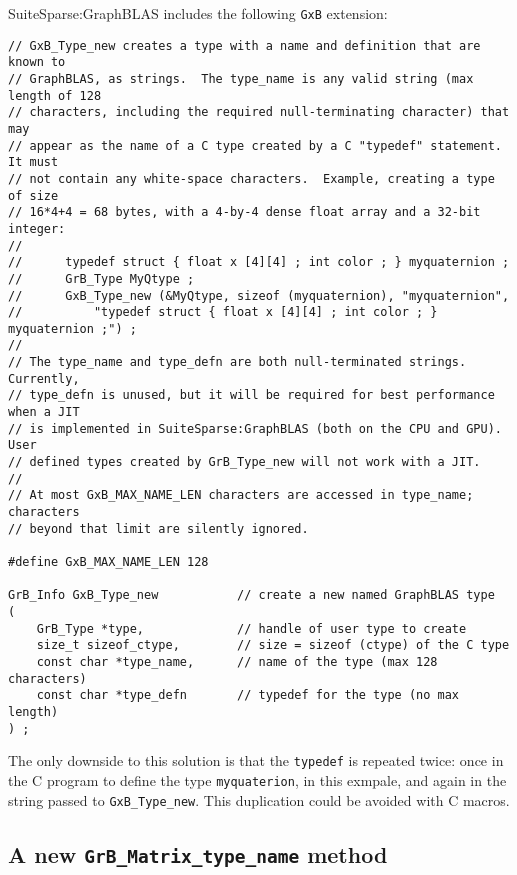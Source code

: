 \documentclass[12pt]{article}
\begin{document}
SuiteSparse:GraphBLAS includes the following \verb'GxB' extension:

{\footnotesize
\begin{verbatim}
// GxB_Type_new creates a type with a name and definition that are known to
// GraphBLAS, as strings.  The type_name is any valid string (max length of 128
// characters, including the required null-terminating character) that may
// appear as the name of a C type created by a C "typedef" statement.  It must
// not contain any white-space characters.  Example, creating a type of size
// 16*4+4 = 68 bytes, with a 4-by-4 dense float array and a 32-bit integer:
//
//      typedef struct { float x [4][4] ; int color ; } myquaternion ;
//      GrB_Type MyQtype ;
//      GxB_Type_new (&MyQtype, sizeof (myquaternion), "myquaternion",
//          "typedef struct { float x [4][4] ; int color ; } myquaternion ;") ;
//
// The type_name and type_defn are both null-terminated strings.  Currently,
// type_defn is unused, but it will be required for best performance when a JIT
// is implemented in SuiteSparse:GraphBLAS (both on the CPU and GPU).  User
// defined types created by GrB_Type_new will not work with a JIT.
//
// At most GxB_MAX_NAME_LEN characters are accessed in type_name; characters
// beyond that limit are silently ignored.

#define GxB_MAX_NAME_LEN 128

GrB_Info GxB_Type_new           // create a new named GraphBLAS type
(
    GrB_Type *type,             // handle of user type to create
    size_t sizeof_ctype,        // size = sizeof (ctype) of the C type
    const char *type_name,      // name of the type (max 128 characters)
    const char *type_defn       // typedef for the type (no max length)
) ;
\end{verbatim}}

The only downside to this solution is that the \verb'typedef' is repeated
twice: once in the C program to define the type \verb'myquaterion', in this
exmpale, and again in the string passed to \verb'GxB_Type_new'.  This
duplication could be avoided with C macros.

\subsection{A new {\tt GrB\_Matrix\_type\_name} method}
\end{document}
